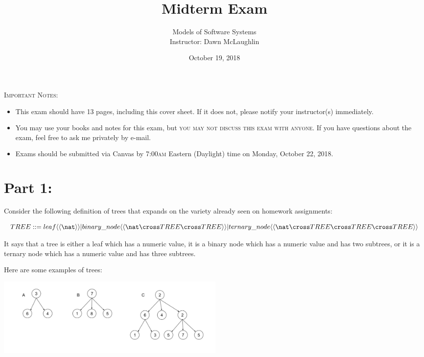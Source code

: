 \documentclass[12pt,fleqn]{article}
\begin{document}
\title{\sc Midterm Exam}
\author{Models of Software Systems\\Instructor: Dawn McLaughlin}
\date{October 19, 2018}
\maketitle

\noindent \textsc{Important Notes:}

\begin{itemize}
\item This exam should have 13 pages, including this cover sheet. If it does not, please notify your instructor(s) immediately.
\item You may use your books and notes for
this exam, but \textsc{you may not discuss this exam with anyone.} If you have questions about the exam, feel free to ask me privately by e-mail.
\item Exams should be submitted via Canvas by 7:00\textsc{am} Eastern (Daylight) time on Monday, October 22, 2018. 
\end{itemize}


\clearpage


\section*{\sc Part 1:}

Consider the following definition of trees that expands on the variety already seen on homework assignments:

$$TREE ::= leaf \langle\langle \nat \rangle\rangle | binary\_node \langle\langle \nat \cross TREE \cross TREE \rangle\rangle | ternary\_node \langle\langle \nat \cross TREE \cross TREE \cross TREE\rangle\rangle$$

It says that a tree is either a leaf which has a numeric value, it is a binary node which has a numeric value and has two subtrees, or it is a ternary node which has a numeric value and has three subtrees.

Here are some examples of trees:

\begin{center}
\includegraphics[width=4.5in]{trees.png}
\end{center}
\end{document}
